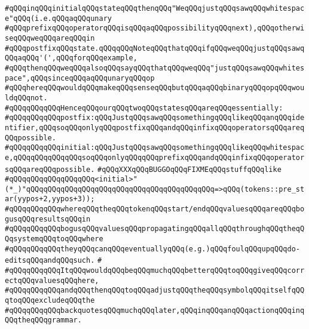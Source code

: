 \verb|#qQQqinqQQqinitialqQQqstateqQQqthenqQQq"WeqQQqjustqQQqsawqQQqwhitespace"qQQq(i.e.qQQqaqQQqunary|\newline
\verb|#qQQqprefixqQQqoperatorqQQqisqQQqaqQQqpossibilityqQQqnext),qQQqotherwiseqQQqweqQQqareqQQqin|\newline
\verb|#qQQqpostfixqQQqstate.qQQqqQQqNoteqQQqthatqQQqifqQQqweqQQqjustqQQqsawqQQqaqQQq'(',qQQqforqQQqexample,|\newline
\verb|#qQQqthenqQQqweqQQqalsoqQQqsayqQQqthatqQQqweqQQq"justqQQqsawqQQqwhitespace",qQQqsinceqQQqaqQQqunaryqQQqop|\newline
\verb|#qQQqhereqQQqwouldqQQqmakeqQQqsenseqQQqbutqQQqaqQQqbinaryqQQqopqQQqwouldqQQqnot.|\newline
\verb|#qQQqqQQqqQQqHenceqQQqourqQQqtwoqQQqstatesqQQqareqQQqessentially:|\newline
\verb|#qQQqqQQqqQQqpostfix:qQQqJustqQQqsawqQQqsomethingqQQqlikeqQQqanqQQqidentifier,qQQqsoqQQqonlyqQQqpostfixqQQqandqQQqinfixqQQqoperatorsqQQqareqQQqpossible.|\newline
\verb|#qQQqqQQqqQQqinitial:qQQqJustqQQqsawqQQqsomethingqQQqlikeqQQqwhitespace,qQQqqQQqqQQqqQQqsoqQQqonlyqQQqqQQqprefixqQQqandqQQqinfixqQQqoperatorsqQQqareqQQqpossible.|\newline
\newline
\verb|#qQQqXXXqQQqBUGGOqQQqFIXMEqQQqstuffqQQqlike|\newline
\verb|#qQQqqQQqqQQqqQQqqQQq<initial>"(*_)"qQQqqQQqqQQqqQQqqQQqqQQqqQQqqQQqqQQqqQQqqQQq=>qQQq(tokens::pre_star(yypos+2,yypos+3));|\newline
\verb|#qQQqqQQqqQQqwhereqQQqtheqQQqtokenqQQqstart/endqQQqvaluesqQQqareqQQqbogusqQQqresultsqQQqin|\newline
\verb|#qQQqqQQqqQQqbogusqQQqvaluesqQQqpropagatingqQQqallqQQqthroughqQQqtheqQQqsystemqQQqtoqQQqwhere|\newline
\verb|#qQQqqQQqqQQqtheyqQQqcanqQQqeventuallyqQQq(e.g.)qQQqfoulqQQqupqQQqdo-editsqQQqandqQQqsuch.|\newline
\verb|#|\newline
\verb|#qQQqqQQqqQQqItqQQqwouldqQQqbeqQQqmuchqQQqbetterqQQqtoqQQqgiveqQQqcorrectqQQqvaluesqQQqhere,|\newline
\verb|#qQQqqQQqqQQqandqQQqthenqQQqtoqQQqadjustqQQqtheqQQqsymbolqQQqitselfqQQqtoqQQqexcludeqQQqthe|\newline
\verb|#qQQqqQQqqQQqbackquotesqQQqmuchqQQqlater,qQQqinqQQqanqQQqactionqQQqinqQQqtheqQQqgrammar.|\newline
\newline
